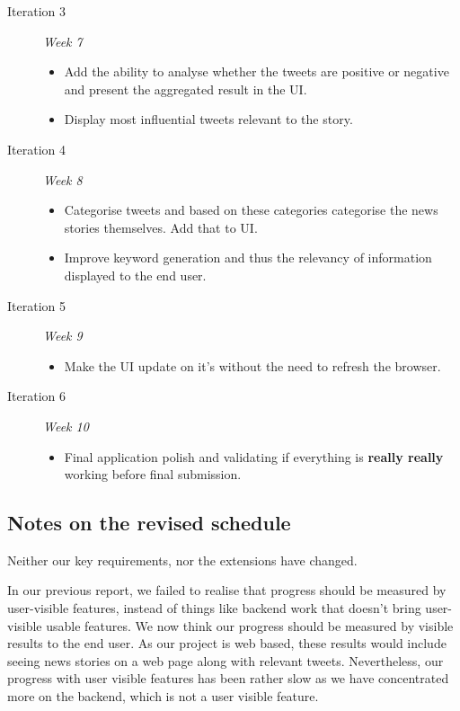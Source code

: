 \documentclass[a4paper,12pt]{article}
\begin{document}
	\begin{description}
   \item[Iteration 3] \emph{Week 7}
   \begin{itemize}
     \item Add the ability to analyse whether the tweets are positive or negative and present the aggregated result in the UI.
     \item Display most influential tweets relevant to the story.
   \end{itemize}
   \item[Iteration 4] \emph{Week 8}
   \begin{itemize}
     \item Categorise tweets and based on these categories categorise the news stories themselves. Add that to UI.
     \item Improve keyword generation and thus the relevancy of information displayed to the end user.
   \end{itemize}
   \item[Iteration 5] \emph{Week 9}
   \begin{itemize}
     \item Make the UI update on it's without the need to refresh the browser.
   \end{itemize}
   \item[Iteration 6] \emph{Week 10}
   \begin{itemize}
     \item Final application polish and validating if everything is \textbf{really really} working before final submission.
   \end{itemize}
  \end{description}
  
  \subsection{Notes on the revised schedule}
	
	Neither our key requirements, nor the extensions have changed.
	
  
	In our previous report, we failed to realise that progress should be measured by user-visible features, instead of things like backend work that doesn't bring user-visible usable features. We now think our progress should be measured by visible results to the end user. As our project is web based, these results would include seeing news stories on a web page along with relevant tweets. Nevertheless, our progress with user visible features has been rather slow as we have concentrated more on the backend, which is not a user visible feature.
\end{document}

